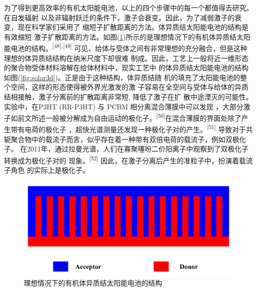 \documentclass[12pt,]{report}
\begin{document}
为了得到更高效率的有机太阳能电池，以上的四个步骤中的每一个都值得去研究。在自发辐射
以及非辐射跃迁的条件下，激子会衰变。因此，为了减弱激子的衰变，现在科学家们采用了
缩短子扩散距离的方法。体异质结太阳能电池的结构是有效缩短
激子扩散距离的方法。如图(\ref{fig:solar})所示的是理想情况下的有机体异质结太阳能电池的结构。\textsuperscript{{[}48{]},{[}49{]}}
可见，给体与受体之间有非常理想的充分融合，但是这种理想的体异质结结构在纳米尺度下却很难
制成。因此，工艺上一般将近一维形态的聚合物受体材料溶解在给体材料中，现实工艺中
的体异质结太阳能电池的结构如图(\ref{fig:solar3d})。正是由于这种结构，体异质结随
机的填充了太阳能电池的整个空间，这样的形态使得被外界光激发的激
子容易在全空间与受体与给体的异质结相接触，激子分离前的扩散距离非常短,
降低了激子在扩 散中途湮灭的可能性。实验中，在P3HT (RR-P3HT) 与 PCBM
相分离混合薄膜中可以发现
，大部分激子如前文所述一般被分解成为自由运动的极化子。\textsuperscript{{[}50{]}}在混合薄膜的界面处除了产生带有电荷的极化子
，超快光谱测量还发现一种极化子对的产生。\textsuperscript{{[}51{]}}
导致对于共轭聚合物中的载流子而言，似乎存在着一种带有双倍电荷的载流子，例如双极化子。
在2011年，通过拉曼光谱，人们在寡聚噻吩二价阳离子中观察到了双极化子转换成为极化子对的
现象。\textsuperscript{{[}52{]}}
因此，在激子分离后产生的准粒子中，扮演着载流子角色 的实际上是极化子。

\begin{figure}[h!]
    \centering
    \includegraphics[scale=0.8]{./figures/solar2d.png}
    \caption{理想情况下的有机体异质结太阳能电池的结构}
    \label{fig:solar}
\end{figure}
\end{document}
